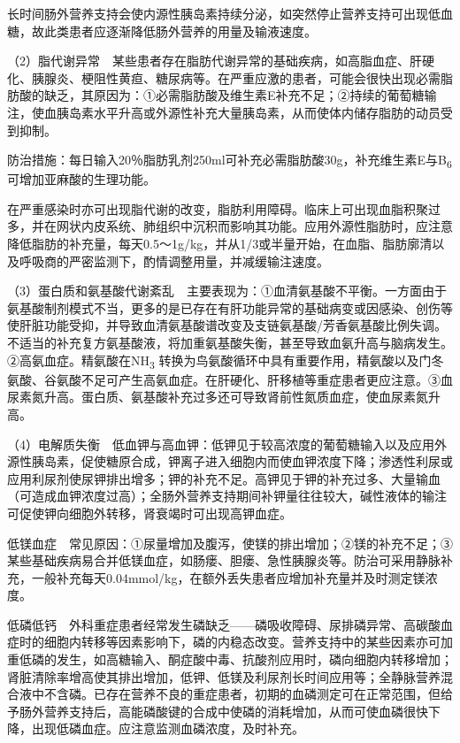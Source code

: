 长时间肠外营养支持会使内源性胰岛素持续分泌，如突然停止营养支持可出现低血糖，故此类患者应逐渐降低肠外营养的用量及输液速度。

（2）脂代谢异常　某些患者存在脂肪代谢异常的基础疾病，如高脂血症、肝硬化、胰腺炎、梗阻性黄疸、糖尿病等。在严重应激的患者，可能会很快出现必需脂肪酸的缺乏，其原因为：①必需脂肪酸及维生素E补充不足；②持续的葡萄糖输注，使血胰岛素水平升高或外源性补充大量胰岛素，从而使体内储存脂肪的动员受到抑制。

防治措施：每日输入20％脂肪乳剂250ml可补充必需脂肪酸30g，补充维生素E与B\textsubscript{6}
可增加亚麻酸的生理功能。

在严重感染时亦可出现脂代谢的改变，脂肪利用障碍。临床上可出现血脂积聚过多，并在网状内皮系统、肺组织中沉积而影响其功能。应用外源性脂肪时，应注意降低脂肪的补充量，每天0.5～1g/kg，并从1/3或半量开始，在血脂、脂肪廓清以及呼吸商的严密监测下，酌情调整用量，并减缓输注速度。

（3）蛋白质和氨基酸代谢紊乱　主要表现为：①血清氨基酸不平衡。一方面由于氨基酸制剂模式不当，更多的是已存在有肝功能异常的基础病变或因感染、创伤等使肝脏功能受抑，并导致血清氨基酸谱改变及支链氨基酸/芳香氨基酸比例失调。不适当的补充复方氨基酸液，将加重氨基酸失衡，甚至导致血氨升高与脑病发生。②高氨血症。精氨酸在NH\textsubscript{3}
转换为鸟氨酸循环中具有重要作用，精氨酸以及门冬氨酸、谷氨酸不足可产生高氨血症。在肝硬化、肝移植等重症患者更应注意。③血尿素氮升高。蛋白质、氨基酸补充过多还可导致肾前性氮质血症，使血尿素氮升高。

（4）电解质失衡　低血钾与高血钾：低钾见于较高浓度的葡萄糖输入以及应用外源性胰岛素，促使糖原合成，钾离子进入细胞内而使血钾浓度下降；渗透性利尿或应用利尿剂使尿钾排出增多；钾的补充不足。高钾见于钾的补充过多、大量输血（可造成血钾浓度过高）；全肠外营养支持期间补钾量往往较大，碱性液体的输注可促使钾向细胞外转移，肾衰竭时可出现高钾血症。

低镁血症　常见原因：①尿量增加及腹泻，使镁的排出增加；②镁的补充不足；③某些基础疾病易合并低镁血症，如肠瘘、胆瘘、急性胰腺炎等。防治可采用静脉补充，一般补充每天0.04mmol/kg，在额外丢失患者应增加补充量并及时测定镁浓度。

低磷低钙　外科重症患者经常发生磷缺乏------磷吸收障碍、尿排磷异常、高碳酸血症时的细胞内转移等因素影响下，磷的内稳态改变。营养支持中的某些因素亦可加重低磷的发生，如高糖输入、酮症酸中毒、抗酸剂应用时，磷向细胞内转移增加；肾脏清除率增高使其排出增加，低钾、低镁及利尿剂长时间应用等；全静脉营养混合液中不含磷。已存在营养不良的重症患者，初期的血磷测定可在正常范围，但给予肠外营养支持后，高能磷酸键的合成中使磷的消耗增加，从而可使血磷很快下降，出现低磷血症。应注意监测血磷浓度，及时补充。


